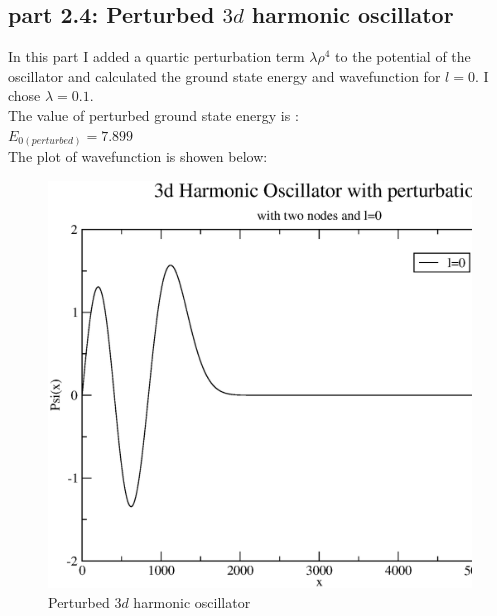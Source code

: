 \documentclass[11pt,a4paper,english]{article}
\begin{document}
    \subsection{part 2.4: Perturbed $3d$ harmonic oscillator }
	
    In this part I added a quartic perturbation term $\lambda\rho^4$ to the 
    potential of the oscillator and calculated the ground state energy and wavefunction
    for $l=0$. I chose $\lambda=0.1$.\\
    The value of perturbed ground state energy is :\\
    $E_{0(perturbed)} = 7.899 $\\
    The plot of wavefunction is showen below:\\
	\begin{figure}[h!]
	\centering
	\includegraphics [scale=0.6]{figures/hw12qn2d.eps}
	\caption{Perturbed $3d$ harmonic oscillator }
	\end{figure}
	\clearpage
    
    
\end{document}
